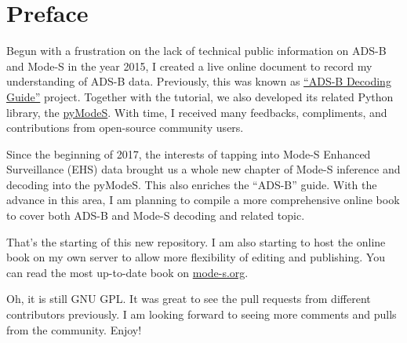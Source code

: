 \chapter*{Preface}\label{preface}
Begun with a frustration on the lack of technical public information on
ADS-B and Mode-S in the year 2015, I created a live online document to
record my understanding of ADS-B data. Previously, this was known as
\href{http://adsb-decode-guide.readthedocs.org/}{``ADS-B Decoding
Guide''} project. Together with the tutorial, we also developed its
related Python library, the
\href{https://github.com/junzis/pyModeS}{pyModeS}. With time, I received
many feedbacks, compliments, and contributions from open-source
community users.

Since the beginning of 2017, the interests of tapping into 
Mode-S Enhanced Surveillance (EHS) data brought us a whole new chapter of Mode-S inference and
decoding into the pyModeS. This also enriches the ``ADS-B'' guide. With
the advance in this area, I am planning to compile a more comprehensive
online book to cover both ADS-B and Mode-S decoding and related topic.

That's the starting of this new repository. I am also starting to host
the online book on my own server to allow more flexibility of editing
and publishing. You can read the most up-to-date book on
\href{http://mode-s.org}{mode-s.org}.

Oh, it is still GNU GPL. It was great to see the pull requests from
different contributors previously. I am looking forward to seeing more
comments and pulls from the community. Enjoy!
